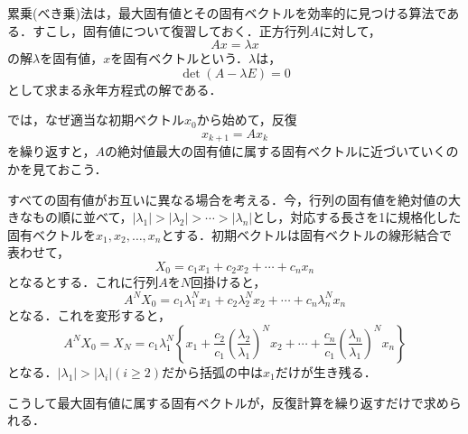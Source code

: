 累乗(べき乗)法は，最大固有値とその固有ベクトルを効率的に見つける算法である．すこし，固有値について復習しておく．正方行列$A$に対して，
\begin{equation}
A x = \lambda x
\end{equation}
の解$\lambda$を固有値，$x$を固有ベクトルという．$\lambda$は，
\begin{equation}
\det( A - \lambda E) =0
\end{equation}
として求まる永年方程式の解である．

では，なぜ適当な初期ベクトル$x_0$から始めて，反復
\begin{equation}
x_{k+1} = A x_k
\end{equation}
を繰り返すと，$A$の絶対値最大の固有値に属する固有ベクトルに近づいていくのかを見ておこう．

すべての固有値がお互いに異なる場合を考える．今，行列の固有値を絶対値の大きなもの順に並べて，$|\lambda_1|>|\lambda_2|>\cdots>|\lambda_n|$とし，対応する長さを1に規格化した固有ベクトルを$x_1, x_2, \ldots, x_n$とする．初期ベクトルは固有ベクトルの線形結合で表わせて，
\begin{equation}
X_0 = c_1x_1+c_2x_2+\cdots+c_nx_n
\end{equation}
となるとする．これに行列$A$を$N$回掛けると，
\begin{equation}
A^N X_0 = c_1 \lambda_1^N x_1+
c_2  \lambda_2^N x_2+\cdots+
c_n  \lambda_n^N x_n
\end{equation}
となる．これを変形すると，
\begin{equation}
A^NX_0 = X_{N}
= c_1 \lambda_1^N \left\{ x_1+
\frac{c_2}{c_1}\left(\frac{\lambda_2}{\lambda_1}\right)^N  x_2+\cdots+
\frac{c_n}{c_1}\left(\frac{\lambda_n}{\lambda_1}\right)^N  x_n \right\}
\end{equation}
となる．$|\lambda_1|>|\lambda_i|(i\ge2)$だから括弧の中は$x_1$だけが生き残る．

こうして最大固有値に属する固有ベクトルが，反復計算を繰り返すだけで求められる．

